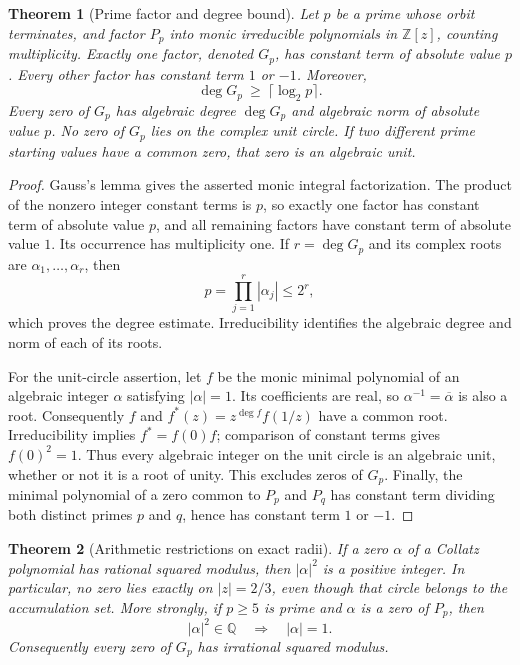 \documentclass[11pt,a4paper]{article}
\newtheorem{theorem}{Theorem}[section]
\theoremstyle{definition}
\theoremstyle{remark}
\numberwithin{equation}{section}
\begin{document}
\begin{theorem}[Prime factor and degree bound]
\label{C:thm:prime-factor-zero}
Let $p$ be a prime whose orbit terminates, and factor $P_p$ into monic
irreducible polynomials in $\mathbb Z[z]$, counting multiplicity.
Exactly one factor, denoted $G_p$, has constant term of absolute value $p$.
Every other factor has constant term $1$ or $-1$. Moreover,
\[
 \deg G_p\ \geq\ \lceil\log_2p\rceil.
\]
Every zero of $G_p$ has algebraic degree $\deg G_p$ and algebraic norm
of absolute value $p$. No zero of $G_p$ lies on the complex unit circle.
If two different prime starting values have a common zero, that zero is
an algebraic unit.
\end{theorem}

\begin{proof}
Gauss's lemma gives the asserted monic integral factorization. The product
of the nonzero integer constant terms is $p$, so exactly one factor has
constant term of absolute value $p$, and all remaining factors have constant
term of absolute value $1$. Its occurrence has multiplicity one.
If $r=\deg G_p$ and its complex roots are $\alpha_1,\ldots,\alpha_r$, then
\[
 p=\prod_{j=1}^r|\alpha_j|\leq 2^r,
\]
which proves the degree estimate. Irreducibility identifies the algebraic
degree and norm of each of its roots.

For the unit-circle assertion, let $f$ be the monic minimal polynomial of
an algebraic integer $\alpha$ satisfying $|\alpha|=1$. Its coefficients are
real, so $\alpha^{-1}=\overline\alpha$ is also a root. Consequently $f$ and
$f^*(z)=z^{\deg f}f(1/z)$ have a common root. Irreducibility implies
$f^*=f(0)f$; comparison of constant terms gives $f(0)^2=1$.
Thus every algebraic integer on the unit circle is an algebraic unit,
whether or not it is a root of unity. This excludes zeros of $G_p$.
Finally, the minimal polynomial of a zero common to $P_p$ and $P_q$
has constant term dividing both distinct primes $p$ and $q$, hence has
constant term $1$ or $-1$.
\end{proof}

\begin{theorem}[Arithmetic restrictions on exact radii]
\label{C:thm:prime-rational-radius}
If a zero $\alpha$ of a Collatz polynomial has rational squared modulus,
then $|\alpha|^2$ is a positive integer. In particular, no zero lies
exactly on $|z|=2/3$, even though that circle belongs to the accumulation
set. More strongly, if $p\geq5$ is prime and $\alpha$ is a zero of $P_p$,
then
\[
 |\alpha|^2\in\mathbb Q\quad\Longrightarrow\quad |\alpha|=1.
\]
Consequently every zero of $G_p$ has irrational squared modulus.
\end{theorem}
\end{document}
